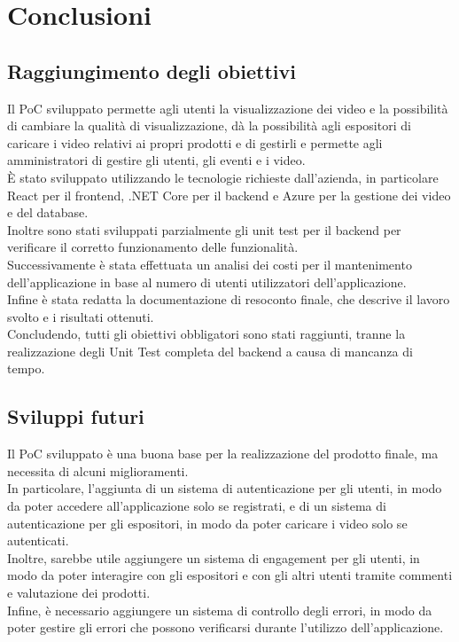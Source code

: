 \chapter{Conclusioni}
\label{cap:conclusioni}

\section{Raggiungimento degli obiettivi}
Il PoC sviluppato permette agli utenti la visualizzazione dei video e la possibilità di cambiare la qualità di visualizzazione, dà la possibilità agli espositori di caricare i video relativi ai propri prodotti e di gestirli e permette agli amministratori di gestire gli utenti, gli eventi e i video.\\
È stato sviluppato utilizzando le tecnologie richieste dall'azienda, in particolare React per il frontend, .NET Core per il backend e Azure per la gestione dei video e del database.\\
Inoltre sono stati sviluppati parzialmente gli unit test per il backend per verificare il corretto funzionamento delle funzionalità.\\
Successivamente è stata effettuata un analisi dei costi per il mantenimento dell'applicazione in base al numero di utenti utilizzatori dell'applicazione.\\
Infine è stata redatta la documentazione di resoconto finale, che descrive il lavoro svolto e i risultati ottenuti.\\
Concludendo, tutti gli obiettivi obbligatori sono stati raggiunti, tranne la realizzazione degli Unit Test completa del backend a causa di mancanza di tempo.\\
\section{Sviluppi futuri}
Il PoC sviluppato è una buona base per la realizzazione del prodotto finale, ma necessita di alcuni miglioramenti.\\
In particolare, l'aggiunta di un sistema di autenticazione per gli utenti, in modo da poter accedere all'applicazione solo se registrati, e di un sistema di autenticazione per gli espositori, in modo da poter caricare i video solo se autenticati.\\
Inoltre, sarebbe utile aggiungere un sistema di engagement per gli utenti, in modo da poter interagire con gli espositori e con gli altri utenti tramite commenti e valutazione dei prodotti.\\
Infine, è necessario aggiungere un sistema di controllo degli errori, in modo da poter gestire gli errori che possono verificarsi durante l'utilizzo dell'applicazione.\\

